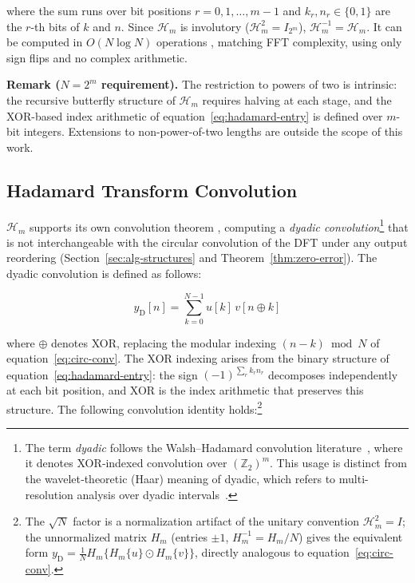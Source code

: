 \documentclass[10pt,a4paper]{amsart}
\begin{document}
\noindent where the sum runs over bit positions $r = 0, 1, \ldots, m-1$ and $k_r, n_r \in \{0,1\}$ are the $r$-th bits of $k$ and $n$. Since $\mathcal{H}_m$ is involutory ($\mathcal{H}_{m}^2 = I_{2^m}$), $\mathcal{H}_m^{-1} = \mathcal{H}_m$. It can be computed in $O(N\log N)$ operations \cite{beauchamp1975walsh, fino1976unified}, matching FFT complexity, using only sign flips and no complex arithmetic.

\medskip
\noindent\textbf{Remark ($N = 2^m$ requirement).} The restriction to powers of two is intrinsic: the recursive butterfly structure of $\mathcal{H}_m$ requires halving at each stage, and the XOR-based index arithmetic of equation~\eqref{eq:hadamard-entry} is defined over $m$-bit integers. Extensions to non-power-of-two lengths are outside the scope of this work.

\subsection{Hadamard Transform Convolution}
\label{sec:hadamard-conv}

$\mathcal{H}_m$ supports its own convolution theorem \cite{doi:10.1049/el:19730172, beauchamp1975walsh, uvsakova2002walsh}, computing a \emph{dyadic convolution}\footnote{The term \emph{dyadic} follows the Walsh--Hadamard convolution literature~\cite{doi:10.1049/el:19730172, beauchamp1975walsh}, where it denotes XOR‑indexed convolution over $(\mathbb{Z}_2)^m$. This usage is distinct from the wavelet‑theoretic (Haar) meaning of dyadic, which refers to multi-resolution analysis over dyadic intervals~\cite{ahmed1975orthogonal}.} that is not interchangeable with the circular convolution of the DFT under any output reordering (Section~\ref{sec:alg-structures} and Theorem~\ref{thm:zero-error}). The dyadic convolution is defined as follows:

\begin{equation}
      \label{eq:dyadic-conv}
       y_{\mathrm{D}}[n] = \sum_{k=0}^{N-1} u[k]\,v[n \oplus k]
\end{equation}

\noindent where $\oplus$ denotes XOR, replacing the modular indexing $(n-k)\bmod N$ of equation~\eqref{eq:circ-conv}. The XOR indexing arises from the binary structure of equation~\eqref{eq:hadamard-entry}: the sign $(-1)^{\sum_r k_r n_r}$ decomposes independently at each bit position, and XOR is the index arithmetic that preserves this structure. The following convolution identity holds:\footnote{The $\sqrt{N}$ factor is a normalization artifact of the unitary convention $\mathcal{H}_m^2 = I$; the unnormalized matrix $H_m$ (entries $\pm1$, $H_m^{-1} = H_m/N$) gives the equivalent form $y_{\mathrm{D}} = \tfrac{1}{N}H_m\{H_m\{u\} \odot H_m\{v\}\}$, directly analogous to equation~\eqref{eq:circ-conv}.}
\end{document}
